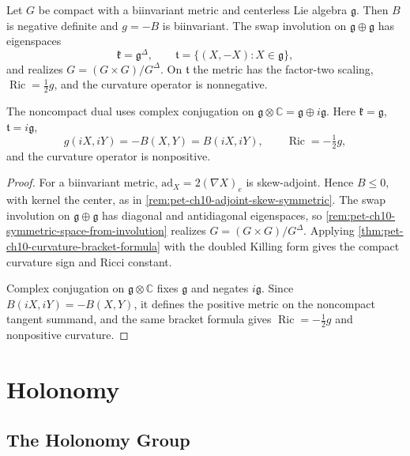\begin{example}
  \label{ex:pet-ch10-lie-group-symmetric}
  Let $G$ be compact with a biinvariant metric and centerless Lie algebra
  $\mathfrak g$. Then $B$ is negative definite and $g=-B$ is biinvariant. The
  swap involution on $\mathfrak g\oplus\mathfrak g$ has eigenspaces
  \[
    \mathfrak k=\mathfrak g^\Delta,
    \qquad \mathfrak t=\{(X,-X):X\in\mathfrak g\},
  \]
  and realizes $G=(G\times G)/G^\Delta$. On $\mathfrak t$ the metric has the
  factor-two scaling, $\operatorname{Ric}=\tfrac12g$, and the curvature operator
  is nonnegative.

  The noncompact dual uses complex conjugation on
  $\mathfrak g\otimes\mathbb C=\mathfrak g\oplus i\mathfrak g$. Here
  $\mathfrak k=\mathfrak g$, $\mathfrak t=i\mathfrak g$,
  \[
    g(iX,iY)=-B(X,Y)=B(iX,iY),\qquad
    \operatorname{Ric}=-\tfrac12g,
  \]
  and the curvature operator is nonpositive.
\end{example}
\begin{proof}
  \sketch
  For a biinvariant metric, $\mathrm{ad}_X=2(\nabla X)_e$ is skew-adjoint.
  Hence $B\le0$, with kernel the center, as in
  \cref{rem:pet-ch10-adjoint-skew-symmetric}. The swap involution on
  $\mathfrak g\oplus\mathfrak g$ has diagonal and antidiagonal eigenspaces, so
  \cref{rem:pet-ch10-symmetric-space-from-involution} realizes
  $G=(G\times G)/G^\Delta$. Applying
  \cref{thm:pet-ch10-curvature-bracket-formula} with the doubled Killing form
  gives the compact curvature sign and Ricci constant.

  Complex conjugation on $\mathfrak g\otimes\mathbb C$ fixes $\mathfrak g$ and
  negates $i\mathfrak g$. Since $B(iX,iY)=-B(X,Y)$, it defines the positive
  metric on the noncompact tangent summand, and the same bracket formula gives
  $\operatorname{Ric}=-\tfrac12g$ and nonpositive curvature.
\end{proof}

\section{Holonomy}

\subsection{The Holonomy Group}


